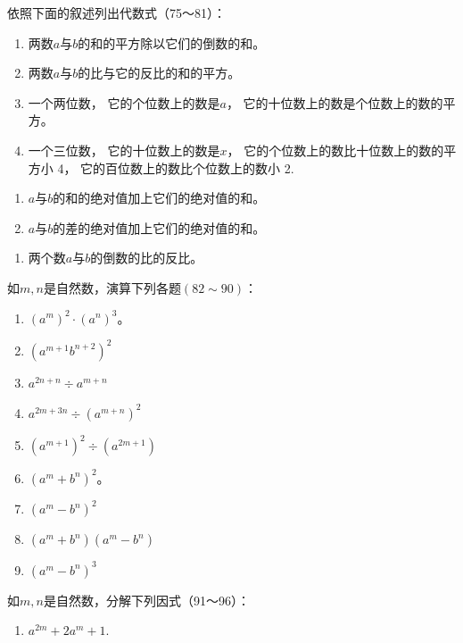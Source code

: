 依照下面的叙述列出代数式（75～81）：

\begin{enumerate}[start=75]
\item
  两数\(a\)与\(b\)的和的平方除以它们的倒数的和。
\item
  两数\(a\)与\(b\)的比与它的反比的和的平方。
\item
  一个两位数， 它的个位数上的数是\(a\)，
  它的十位数上的数是个位数上的数的平方。
\item
  一个三位数， 它的十位数上的数是\(x\)，
  它的个位数上的数比十位数上的数的平方小 4，
  它的百位数上的数比个位数上的数小 2.
\end{enumerate}

\begin{enumerate}[start=79]
\item
  \(a\)与\(b\)的和的绝对值加上它们的绝对值的和。
\item
  \(a\)与\(b\)的差的绝对值加上它们的绝对值的和。
\end{enumerate}

\begin{enumerate}[start=81]
\item
  两个数\(a\)与\(b\)的倒数的比的反比。
\end{enumerate}

如\(m, n\)是自然数，演算下列各题\((82 \sim 90)\)：

\begin{enumerate}[start=82]
\item
  \((a^{m})^{2} \cdot (a^{n})^{3}\)。
\item
  \((a^{m + 1}b^{n + 2})^2\)
\item
  \(a^{2n + n}\div a^{m + n}\)
\item
  \(a^{2m + 3n}\div (a^{m + n})^2\)
\item
  \((a^{m + 1})^2\div (a^{2m + 1})\)
\item
  \((a^{m} + b^{n})^{2}\)。
\item
  \((a^{m} - b^{n})^{2}\)
\item
  \((a^{m} + b^{n})(a^{m} - b^{n})\)
\item
  \((a^{m} - b^{n})^{3}\)
\end{enumerate}

如\(m, n\)是自然数，分解下列因式（91～96）：

\begin{enumerate}[start=91]
\item
  \(a^{2m} + 2a^{m} + 1.\)
\end{enumerate}


